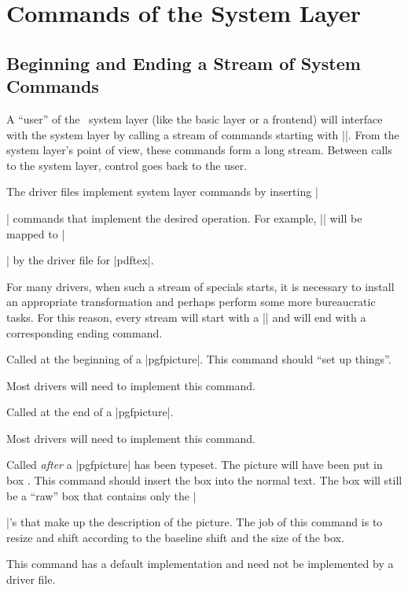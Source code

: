 %
%
%


\section{Commands of the System Layer}

\makeatletter

\subsection{Beginning and Ending a Stream of System Commands}

A ``user'' of the \pgfname\ system layer (like the basic layer or a frontend)
will interface with the system layer by calling a stream of commands starting
with |\pgfsys@|. From the system layer's point of view, these commands form a
long stream. Between calls to the system layer, control goes back to the user.

The driver files implement system layer commands by inserting |\special|
commands that implement the desired operation. For example, |\pgfsys@stroke|
will be mapped to || by the driver file for |pdftex|.

For many drivers, when such a stream of specials starts, it is necessary to
install an appropriate transformation and perhaps perform some more
bureaucratic tasks. For this reason, every stream will start with a
|\pgfsys@beginpicture| and will end with a corresponding ending command.

\begin{command}{\pgfsys@beginpicture}
    Called at the beginning of a |{pgfpicture}|. This command should ``set up
    things''.

    Most drivers will need to implement this command.
\end{command}

\begin{command}{\pgfsys@endpicture}
  Called at the end of a |{pgfpicture}|.

  Most drivers will need to implement this command.
\end{command}

\begin{command}{\pgfsys@typesetpicturebox{}}
    Called \emph{after} a |{pgfpicture}| has been typeset. The picture will
    have been put in box . This command should insert the box into
    the normal text. The box  will still be a ``raw'' box that
    contains only the |\special|'s that make up the description of the picture.
    The  job of this command is to resize and shift  according to the
    baseline shift and the size of the box.

    This command has a default implementation and need not be implemented by a
    driver file.
\end{command}

